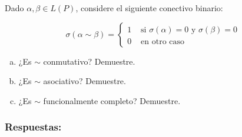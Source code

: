 
\newcommand\myeq{\stackrel{\mathclap{\scriptsize\mbox{HI}}}{\equiv}}

Dado $\alpha, \beta \in L(P)$, considere el siguiente conectivo binario:

\[ \sigma(\alpha \sim \beta) = 
\begin{cases}
    1 & \text{ si $\sigma(\alpha) = 0$ y $\sigma(\beta)= 0$} \\
    0 & \text{ en otro caso}
\end{cases} 
\]

\begin{enumerate}[a)]
  \item ¿Es $\sim$ conmutativo? Demuestre.
  \item ¿Es $\sim$ asociativo? Demuestre.
  \item ¿Es $\sim$ funcionalmente completo? Demuestre.
\end{enumerate}

\subsubsection*{Respuestas:}

